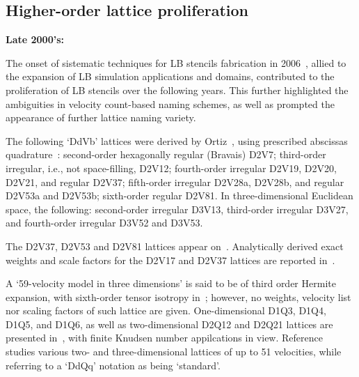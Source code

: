     \subsection{Higher-order lattice proliferation}

    \vspace{2.0mm}\noindent\textbf{Late 2000's:}\vspace{1.0mm}

    The onset of sistematic techniques  for  LB  stencils  fabrication  in  2006~\cite{2006-ChikatamarlaSS+KarlinIV-PhysRevLett,
    2006-PhilippiPC+SurmasR-PhysRevE, 2006-ShanX+ChenH-JFluidMech}, allied to the expansion of LB  simulation  applications  and
    domains, contributed to the proliferation of LB stencils over the following years. This further highlighted the  ambiguities
    in velocity count-based naming schemes, as well as prompted the appearance of further lattice naming variety.

    The  following  `DdVb'  lattices   were   derived   by   Ortiz~\cite{2007-OrtizCEP-DrUFSC},   using   prescribed   abscissas
    quadrature~\cite{2006-PhilippiPC+SurmasR-PhysRevE}: second-order hexagonally regular (Bravais) D2V7; third-order  irregular,
    i.e., not space-filling, D2V12; fourth-order irregular D2V19, D2V20, D2V21, and regular D2V37; fifth-order irregular D2V28a,
    D2V28b, and regular D2V53a and D2V53b; sixth-order regular D2V81.  In  three-dimensional  Euclidean  space,  the  following:
    second-order irregular D3V13, third-order irregular D3V27, and fourth-order irregular D3V52 and D3V53.

    The D2V37, D2V53 and D2V81 lattices appear on~\cite{2007-PhilippiPC+DosSantosLOE-IntJModPhysC}. Analytically  derived  exact
    weights and scale factors for the D2V17 and D2V37 lattices are reported in~\cite{2007-SiebertDN+PhilippiPC-IntJModPhysC}.

    A `59-velocity model in three dimensions' is said to be of third order Hermite expansion, with sixth-order  tensor  isotropy
    in~\cite{2008-ChenH+ShanX-PhysD}; however, no weights, velocity  list  nor  scaling  factors  of  such  lattice  are  given.
    One-dimensional  D1Q3,  D1Q4,  D1Q5,  and  D1Q6,  as  well  as  two-dimensional  D2Q12  and  D2Q21  lattices  are  presented
    in~\cite{2008-KimSH+BoydID-JComputPhys},      with      finite      Knudsen      number      appilcations      in      view.
    Reference~\cite{2008-RubinsteinR+LuoLS-PhysRev} studies various two- and three-dimensional lattices of up to 51  velocities,
    while referring to a `DdQq' notation as being `standard'.

